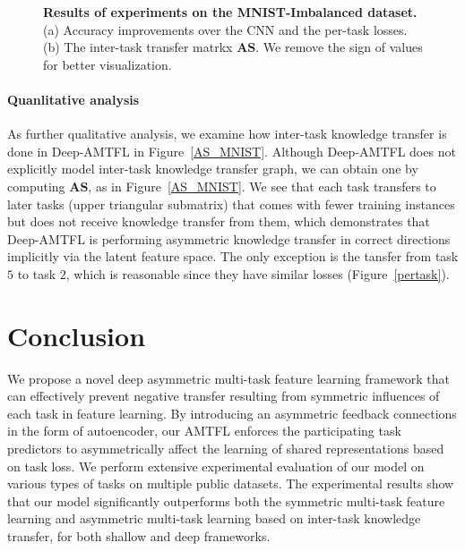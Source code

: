 \documentclass{article}
\newcommand{\mat}[1]{\boldsymbol{#1}} %
\begin{document}
	\begin{figure}
		\vspace{-0.1in}
		\begin{center}
			\hfill
		\vspace{-0.15in}
			\caption{\small \textbf{Results of experiments on the MNIST-Imbalanced dataset.} (a) Accuracy improvements over the CNN and the per-task losses. (b) The inter-task transfer matrkx $\mat{AS}$.  We remove the sign of values for better visualization.}
			\vspace{-0.23in}
		\end{center}
	\end{figure}
	
	\paragraph{Quanlitative analysis}
	As further qualitative analysis, we examine how inter-task knowledge transfer is done in Deep-AMTFL in Figure~\ref{AS_MNIST}. Although Deep-AMTFL does not explicitly model inter-task knowledge transfer graph, we can obtain one by computing $\mat{AS}$, as in Figure~\ref{AS_MNIST}. We see that each task transfers to later tasks (upper triangular submatrix) that comes with fewer training instances but does not receive knowledge transfer from them, which demonstrates that Deep-AMTFL is performing asymmetric knowledge transfer in correct directions implicitly via the latent feature space. The only exception is the tansfer from task $5$ to task $2$, which is reasonable since they have similar losses (Figure~\ref{pertask}). 

	\section{Conclusion}
	We propose a novel deep asymmetric multi-task feature learning framework that can effectively prevent negative transfer resulting from symmetric influences of each task in feature learning. By introducing an asymmetric feedback connections in the form of autoencoder, our AMTFL enforces the participating task predictors to asymmetrically affect the learning of shared representations based on task loss. We perform extensive experimental evaluation of our model on various types of tasks on multiple public datasets. The experimental results show that our model significantly outperforms both the symmetric multi-task feature learning and asymmetric multi-task learning based on inter-task knowledge transfer, for both shallow and deep frameworks.
	
\end{document}
